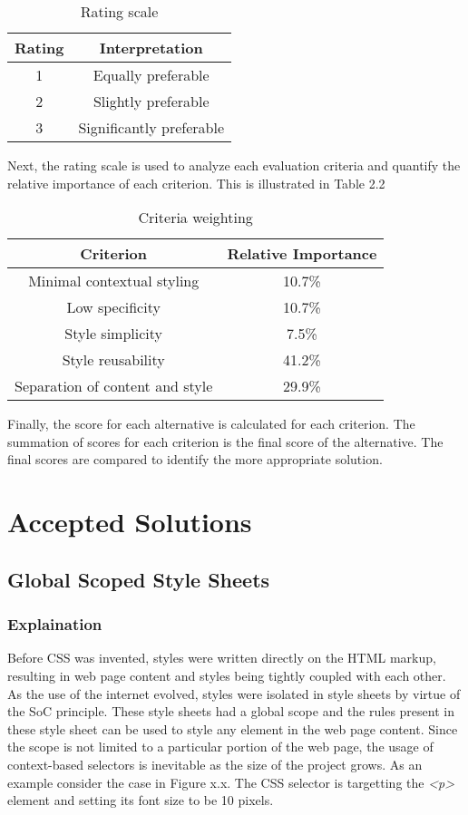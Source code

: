 \documentclass[12pt]{article}
\begin{document}
\begin{table}[h]
	\centering
	\begin{tabular}{|c|c|}
		\hline
		\textbf{Rating} & \textbf{Interpretation} \\ 
		\hline
		1 & Equally preferable \\
		\hline 
		2 & Slightly preferable \\
		\hline
		3 & Significantly preferable \\
		\hline
	\end{tabular}
	\caption{Rating scale}
\end{table}

Next, the rating scale is used to analyze each evaluation criteria and quantify the relative importance of each criterion. This is illustrated in Table 2.2

\begin{table}[h]
	\centering
	\begin{tabular}{|c|c|}
		\hline
		\textbf{Criterion} & \textbf{Relative Importance} \\ 
		\hline
		Minimal contextual styling & 10.7\% \\
		\hline 
		Low specificity & 10.7\% \\
		\hline
		Style simplicity & 7.5\% \\
		\hline
		Style reusability & 41.2\% \\
		\hline
		Separation of content and style & 29.9\% \\
		\hline
	\end{tabular}
	\caption{Criteria weighting}
\end{table}

Finally, the score for each alternative is calculated for each criterion. The summation of scores for each criterion is the final score of the alternative. The final scores are compared to identify the more appropriate solution.

\newpage

\section{Accepted Solutions}
\subsection{Global Scoped Style Sheets}
\subsubsection{Explaination}
Before CSS was invented, styles were written directly on the HTML markup, resulting in web page content and styles being tightly coupled with each other. As the use of the internet evolved, styles were isolated in style sheets by virtue of the SoC principle. These style sheets had a global scope and the rules present in these style sheet can be used to style any element in the web page content. Since the scope is not limited to a particular portion of the web page, the usage of context-based selectors is inevitable as the size of the project grows. As an example consider the case in Figure x.x. The CSS selector is targetting the \textit{<p>} element and setting its font size to be 10 pixels.
\end{document}
